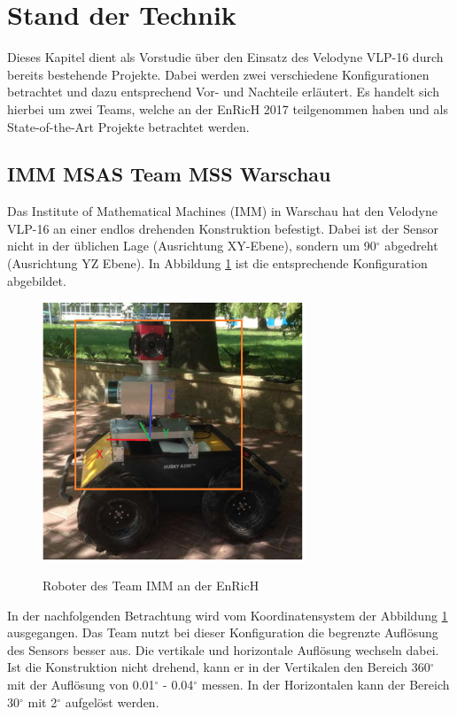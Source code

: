 \section{Stand der Technik}
 \label{sec:Vorzeigeprojekte}
 Dieses Kapitel dient als Vorstudie über den Einsatz des Velodyne VLP-16 durch bereits bestehende Projekte. Dabei werden zwei verschiedene Konfigurationen betrachtet und dazu entsprechend Vor- und Nachteile erläutert. Es handelt sich hierbei um zwei Teams, welche an der \ac{EnRicH} 2017 teilgenommen haben und als State-of-the-Art Projekte betrachtet werden.
 
 \subsection{IMM MSAS Team MSS Warschau}
 \label{subsec:IMM}
Das Institute of Mathematical Machines (IMM) in Warschau hat den Velodyne VLP-16 an einer endlos drehenden Konstruktion befestigt. Dabei ist der Sensor nicht in der üblichen Lage (Ausrichtung XY-Ebene), sondern um 90$^\circ$ abgedreht (Ausrichtung YZ Ebene). In Abbildung \ref{fig:imm} ist die entsprechende Konfiguration abgebildet. 

   \begin{figure}[H]
	\centering
	\includegraphics[width=0.7\textwidth]
	{resources/IMM.PNG}
	\caption[Roboter des Team IMM EnRicH]{Roboter des Team IMM an der EnRicH} \protect\cite{IMM}
	\label{fig:imm}
\end{figure}

In der nachfolgenden Betrachtung wird vom Koordinatensystem der Abbildung \ref{fig:imm} ausgegangen.
Das Team nutzt bei dieser Konfiguration die begrenzte Auflösung des Sensors besser aus. Die vertikale und horizontale Auflösung wechseln dabei. Ist die Konstruktion nicht drehend, kann er in der Vertikalen den Bereich 360$^\circ$ mit der Auflösung von 0.01$^\circ$ - 0.04$^\circ$ messen. In der Horizontalen kann der Bereich 30$^\circ$ mit 2$^\circ$ aufgelöst werden. 

